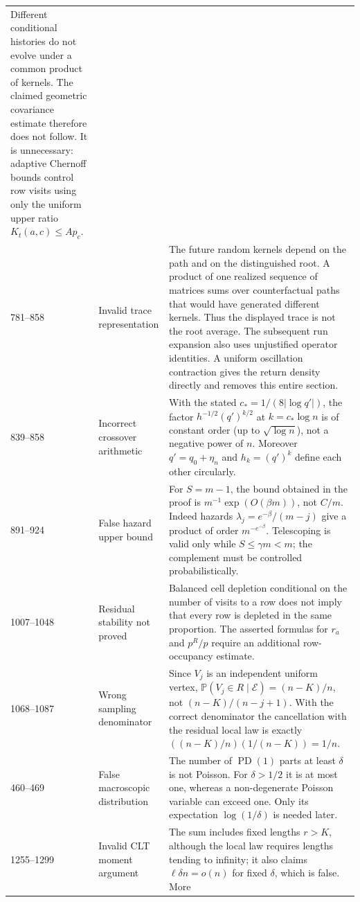 \documentclass[11pt]{article}
\newcommand{\Pp}{\mathbb P}
\newcommand{\1}{\mathbf 1}
\newcommand{\PD}{\operatorname{PD}(1)}
\theoremstyle{remark}
\begin{document}
\begin{longtable}{p{}p{}p{}}
Different conditional histories do not evolve under a common product of
kernels.  The claimed geometric covariance estimate therefore does not
follow.  It is unnecessary: adaptive Chernoff bounds control row visits using
only the uniform upper ratio $K_t(a,c)\le A p_c$. \\
781--858 & Invalid trace representation & The future random kernels depend on
the path and on the distinguished root.  A product of one realized sequence
of matrices sums over counterfactual paths that would have generated different
kernels.  Thus the displayed trace is not the root average.  The subsequent
run expansion also uses unjustified operator identities.  A uniform
oscillation contraction gives the return density directly and removes this
entire section. \\
839--858 & Incorrect crossover arithmetic & With the stated
$c_*=1/(8|\log q'|)$, the factor
$h^{-1/2}(q')^{k/2}$ at $k=c_*\log n$ is of constant order (up to
$\sqrt{\log n}$), not a negative power of $n$.  Moreover $q'=q_0+\eta_n$ and
$h_k=(q')^k$ define each other circularly. \\
891--924 & False hazard upper bound & For $S=m-1$, the bound obtained in the
proof is $m^{-1}\exp(O(\beta m))$, not $C/m$.  Indeed hazards
$\lambda_j=e^{-\beta}/(m-j)$ give a product of order $m^{-e^{-\beta}}$.
Telescoping is valid only while $S\le\gamma m< m$; the complement must be
controlled probabilistically. \\
1007--1048 & Residual stability not proved & Balanced cell depletion conditional
on the number of visits to a row does not imply that every row is depleted in
the same proportion.  The asserted formulas for $r_a$ and $p^R/p$ require an
additional row-occupancy estimate. \\
1068--1087 & Wrong sampling denominator & Since $V_j$ is an independent uniform
vertex, $\Pp(V_j\in R\mid\mathcal E)=(n-K)/n$, not
$(n-K)/(n-j+1)$.  With the correct denominator the cancellation with the
residual local law is exactly $((n-K)/n)(1/(n-K))=1/n$. \\
460--469 & False macroscopic distribution & The number of $\PD$ parts at least
$\delta$ is not Poisson.  For $\delta>1/2$ it is at most one, whereas a
non-degenerate Poisson variable can exceed one.  Only its expectation
$\log(1/\delta)$ is needed later. \\
1255--1299 & Invalid CLT moment argument & The sum includes fixed lengths
$r>K$, although the local law requires lengths tending to infinity; it also
claims $\ell\delta n=o(n)$ for fixed $\delta$, which is false.  More

\end{longtable}
\end{document}
